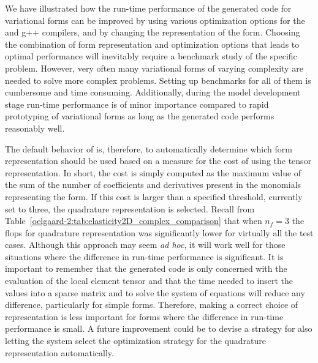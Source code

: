 We have illustrated how the run-time performance of the generated code
for variational forms can be improved by using various optimization
options for the \ffc{} and g++ compilers, and by changing the
representation of the form.  Choosing the combination of form
representation and optimization options that leads to optimal
performance will inevitably require a benchmark study of the specific
problem.  However, very often many variational forms of varying
complexity are needed to solve more complex problems. Setting up
benchmarks for all of them is cumbersome and time consuming.
Additionally, during the model development stage run-time performance
is of minor importance compared to rapid prototyping of variational
forms as long as the generated code performs reasonably well.

The default behavior of \ffc{} is, therefore, to automatically
determine which form representation should be used based on a measure
for the cost of using the tensor representation.  In short, the cost
is simply computed as the maximum value of the sum of the number of
coefficients and derivatives present in the monomials representing the
form.  If this cost is larger than a specified threshold, currently
set to three, the quadrature representation is selected.  Recall from
Table~\ref{oelgaard-2:tab:elasticity2D_complex_comparison} that when
$n_f=3$ the flops for quadrature representation was significantly
lower for virtually all the test cases.  Although this approach may
seem \emph{ad hoc}, it will work well for those situations where the
difference in run-time performance is significant.  It is important to
remember that the generated code is only concerned with the evaluation
of the local element tensor and that the time needed to insert the
values into a sparse matrix and to solve the system of equations will
reduce any difference, particularly for simple forms.  Therefore,
making a correct choice of representation is less important for forms
where the difference in run-time performance is small.  A future
improvement could be to devise a strategy for also letting the system
select the optimization strategy for the quadrature representation
automatically.
